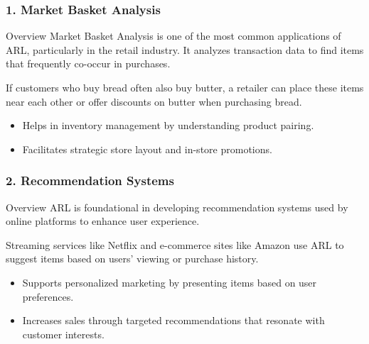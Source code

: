 \documentclass{beamer}
\begin{document}
\begin{frame}[fragile]
    \frametitle{1. Market Basket Analysis}
    \begin{block}{Overview}
        Market Basket Analysis is one of the most common applications of ARL, particularly in the retail industry. It analyzes transaction data to find items that frequently co-occur in purchases.
    \end{block}
    
    \begin{example}
        If customers who buy bread often also buy butter, a retailer can place these items near each other or offer discounts on butter when purchasing bread.
    \end{example}

    \begin{itemize}
        \item Helps in inventory management by understanding product pairing.
        \item Facilitates strategic store layout and in-store promotions.
    \end{itemize}
\end{frame}

\begin{frame}[fragile]
    \frametitle{2. Recommendation Systems}
    \begin{block}{Overview}
        ARL is foundational in developing recommendation systems used by online platforms to enhance user experience.
    \end{block}
    
    \begin{example}
        Streaming services like Netflix and e-commerce sites like Amazon use ARL to suggest items based on users' viewing or purchase history.
    \end{example}

    \begin{itemize}
        \item Supports personalized marketing by presenting items based on user preferences.
        \item Increases sales through targeted recommendations that resonate with customer interests.
    \end{itemize}
\end{frame}
\end{document}
